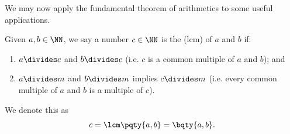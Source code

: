 We may now apply the fundamental theorem of arithmetics to some useful applications.

\begin{definition}
    Given \(a, b \in \NN\), we say a number \(c \in \NN\) is the  (lcm) of \(a\) and \(b\) if:
    \begin{enumerate}
        \item \(a \divides c\) and \(b \divides c\) (i.e. \(c\) is a common multiple of \(a\) and \(b\)); and
        \item \(a \divides m\) and \(b \divides m\) implies \(c \divides m\) (i.e. every common multiple of \(a\) and \(b\) is a multiple of \(c\)).
    \end{enumerate}

    We denote this as
    \[
        c = \lcm\pqty{a, b} = \bqty{a, b}.
    \]  
\end{definition}

